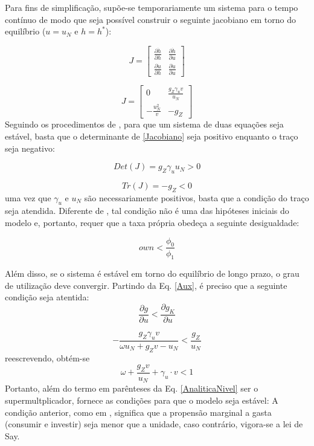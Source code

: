 Para fins de simplificação, supõe-se temporariamente um sistema para o tempo contínuo de modo que seja possível construir o seguinte jacobiano em torno do equilíbrio ($u = u_N$ e $h = h^*$):

$$
J = 
\left[\begin{matrix}
\frac{\partial \dot h}{\partial h} & \frac{\partial \dot h}{\partial u}\\
\frac{\partial \dot u}{\partial h} & \frac{\partial \dot u}{\partial u}
\end{matrix}\right]
$$

\begin{equation}
J = 
\label{Jacobiano}
\left[\begin{matrix}0 & \frac{g_Z \gamma_{u} v}{u_N}\\- \frac{u_N^{2}}{v} & - g_Z\end{matrix}\right]
\end{equation}
Seguindo os procedimentos de \textcite{gandolfo_economic_2010}, para que um sistema de duas equações seja estável, basta que o determinante de \ref{Jacobiano} seja positivo enquanto o traço seja negativo:

$$
Det(J) = g_Z \gamma_{u} u_N > 0
$$

$$
Tr(J) = -g_Z < 0
$$
uma vez que $\gamma_u$ e $u_N$ são necessariamente positivos, basta que a condição do traço seja atendida. Diferente de \textcite{freitas_growth_2015}, tal condição não é uma das hipóteses iniciais do modelo e, portanto, requer que a taxa própria obedeça a seguinte desigualdade:

\begin{equation}
own < \frac{\phi_0}{\phi_1}
\end{equation}

Além disso, se o sistema é estável em torno do equilíbrio de longo prazo, o grau de utilização deve convergir. Partindo da Eq. \ref{Aux}, é preciso que a seguinte condição seja atentida:
$$
\frac{\partial g}{\partial u} < \frac{\partial g_K}{\partial u}
$$

$$
- \frac{g_Z \gamma_{u} v}{\omega u_N + g_Z v - u_N} < \frac{g_Z}{u_N}
$$
reescrevendo, obtém-se
\begin{equation}
\omega + \frac{g_Z v}{u_N} + \gamma_u\cdot v < 1
\end{equation}
Portanto, além do termo em parênteses da Eq. \ref{AnaliticaNivel} ser o supermultplicador, fornece as condições para que o modelo seja estável: 
A condição anterior, como em \textcite{freitas_growth_2015}, significa que a propensão marginal a gasta (consumir e investir) seja menor que a unidade, caso contrário, vigora-se a lei de Say.


